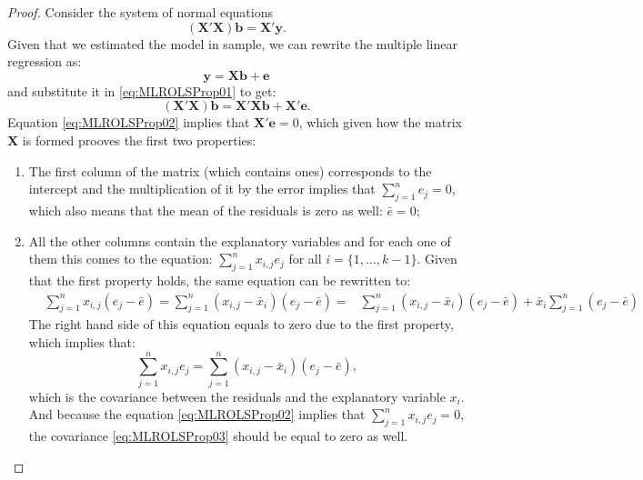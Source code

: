 \documentclass[
]{book}
\providecommand{\tightlist}{%
  \setlength{\itemsep}{0pt}\setlength{\parskip}{0pt}}
\theoremstyle{definition}
\theoremstyle{definition}
\theoremstyle{definition}
\theoremstyle{definition}
\theoremstyle{remark}
\begin{document}
\begin{proof}
Consider the system of normal equations
\begin{equation}
    \left(\mathbf{X}' \mathbf{X}\right) \mathbf{b} = \mathbf{X}' \mathbf{y} .
    \label{eq:MLROLSProp01}
\end{equation}
Given that we estimated the model in sample, we can rewrite the multiple linear regression as:
\begin{equation*}
    \mathbf{y} = \mathbf{X} \boldsymbol{b} + \boldsymbol{e} 
\end{equation*}
and substitute it in \eqref{eq:MLROLSProp01} to get:
\begin{equation}
    \left(\mathbf{X}' \mathbf{X}\right) \mathbf{b} = \mathbf{X}' \mathbf{X} \boldsymbol{b} + \mathbf{X}' \boldsymbol{e} .
    \label{eq:MLROLSProp02}
\end{equation}
Equation \eqref{eq:MLROLSProp02} implies that \(\mathbf{X}' \boldsymbol{e}=0\), which given how the matrix \(\mathbf{X}\) is formed prooves the first two properties:

\begin{enumerate}
\def\labelenumi{\arabic{enumi}.}
\tightlist
\item
  The first column of the matrix (which contains ones) corresponds to the intercept and the multiplication of it by the error implies that \(\sum_{j=1}^n e_j =0\), which also means that the mean of the residuals is zero as well: \(\bar{e}=0\);
\item
  All the other columns contain the explanatory variables and for each one of them this comes to the equation: \(\sum_{j=1}^n x_{i,j} e_j\) for all \(i=\{1, \dots, k-1\}\). Given that the first property holds, the same equation can be rewritten to:
  \begin{equation*}
   \begin{aligned}
   & \sum_{j=1}^n x_{i,j} (e_j - \bar{e}) = \sum_{j=1}^n (x_{i,j} - \bar{x}_i) (e_j - \bar{e}) =
   & \sum_{j=1}^n (x_{i,j} - \bar{x}_i) (e_j - \bar{e}) + \bar{x}_i \sum_{j=1}^n (e_j - \bar{e})
   \end{aligned}
  \end{equation*}
  The right hand side of this equation equals to zero due to the first property, which implies that:
  \begin{equation}
   \sum_{j=1}^n x_{i,j} e_j = \sum_{j=1}^n (x_{i,j} - \bar{x}_i) (e_j - \bar{e}),
   \label{eq:MLROLSProp03}
  \end{equation}
  which is the covariance between the residuals and the explanatory variable \(x_i\). And because the equation \eqref{eq:MLROLSProp02} implies that \(\sum_{j=1}^n x_{i,j} e_j=0\), the covariance \eqref{eq:MLROLSProp03} should be equal to zero as well.
\end{enumerate}


\end{proof}
\end{document}

